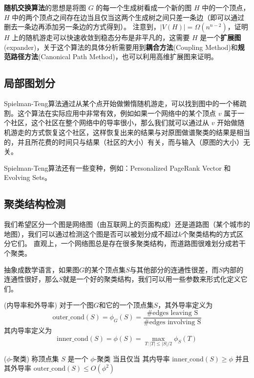 \documentclass[lang=cn,newtx,10pt,scheme=chinese,chinesefont=nofont,citestyle=gb7714-2015, bibstyle=gb7714-2015]{elegantbook}
\begin{document}
\begin{refsection}
\textbf{随机交换算法}的思想是将图 $G$ 的每一个生成树看成一个新的图 $H$ 中的一个顶点，$H$ 中的两个顶点之间存在边当且仅当这两个生成树之间只差一条边（即可以通过删去一条边再添加另一条边的方式得到）。
注意到，$|V(H)|=\Omega(n^{n-2})$，证明 $H$ 上的随机游走可以快速收敛到稳态分布是非平凡的，这需要 $H$ 是一个\textbf{扩展图}(expander)，关于这个算法的具体分析需要用到\textbf{耦合方法}(Coupling Method)和\textbf{规范路径方法}(Canonical Path Method)，也可以利用高维扩展图来证明。

\subsection{局部图划分}
Spielman-Teng算法通过从某个点开始做懒惰随机游走，可以找到图中的一个稀疏割。这个算法在实际应用中非常有效，例如如果一个网络中的某个顶点 $v$ 属于一个社区，这个社区在整个网络中的导率很小，那么我们就可以通过从 $v$ 开始做随机游走的方式恢复这个社区，这样恢复出来的结果与对原图做谱聚类的结果是相当的，并且所花费的时间只与结果（社区的大小）有关，而与输入（原图的大小）无关。

Spielman-Teng算法还有一些变种，例如：Personalized PageRank Vector 和 Evolving Sets。

\subsection{聚类结构检测}
我们希望区分一个图是网络图（由互联网上的页面构成）还是道路图（某个城市的地图），我们可以通过检测这个图是否可以被划分成不超过$k$个聚类结构的方式区分它们。
直观上，一个网络图总是存在很多聚类结构，而道路图很难划分成若干个聚类。

抽象成数学语言，如果图$G$的某个顶点集$S$与其他部分的连通性很差，而$S$内部的连通性很好，那么$S$就是一个好的聚类结构，我们可以用一些参数来形式化定义它们。

\begin{definition}{(内导率和外导率)}
    对于一个图$G$和它的一个顶点集$S$，其外导率定义为
    \[
    \mathrm{outer\_cond}(S)=\phi_G(S)=\frac{\# \text{edges leaving S}}{\# \text{edges involving S}}
    \]
    其内导率定义为
    \[
    \mathrm{inner\_cond}(S)=\phi(S)=\max_{T:|T|\leq |S|/2} \phi_S(T)
    \]
\end{definition}

\begin{definition}{($\phi$-聚类)}
    称顶点集 $S$ 是一个 $\phi$-聚类 当且仅当 其内导率 $\mathrm{inner\_cond}(S)\geq \phi$ 并且 其外导率 $\mathrm{outer\_cond}(S)\leq O(\phi^2)$
\end{definition}


\end{refsection}
\end{document}
